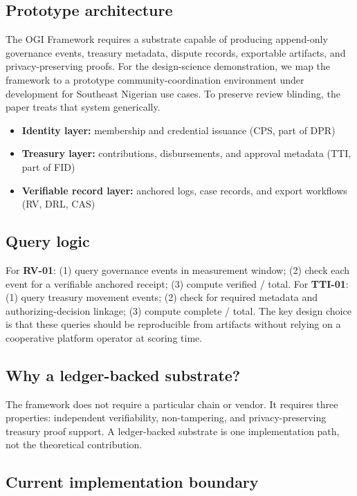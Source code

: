 \documentclass[sigconf,anonymous]{acmart}
\begin{document}
\subsection{Prototype architecture}

The OGI Framework requires a substrate capable of producing append-only governance events, treasury metadata, dispute records, exportable artifacts, and privacy-preserving proofs. For the design-science demonstration, we map the framework to a prototype community-coordination environment under development for Southeast Nigerian use cases. To preserve review blinding, the paper treats that system generically.

\begin{itemize}
\item \textbf{Identity layer:} membership and credential issuance (CPS, part of DPR)
\item \textbf{Treasury layer:} contributions, disbursements, and approval metadata (TTI, part of FID)
\item \textbf{Verifiable record layer:} anchored logs, case records, and export workflows (RV, DRL, CAS)
\end{itemize}

\subsection{Query logic}

For \textbf{RV-01}: (1) query governance events in measurement window; (2) check each event for a verifiable anchored receipt; (3) compute verified / total. For \textbf{TTI-01}: (1) query treasury movement events; (2) check for required metadata and authorizing-decision linkage; (3) compute complete / total. The key design choice is that these queries should be reproducible from artifacts without relying on a cooperative platform operator at scoring time.

\subsection{Why a ledger-backed substrate?}

The framework does not require a particular chain or vendor. It requires three properties: independent verifiability, non-tampering, and privacy-preserving treasury proof support. A ledger-backed substrate is one implementation path, not the theoretical contribution.

\subsection{Current implementation boundary}
\end{document}

